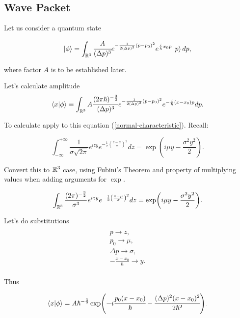 \documentclass[main.tex]{subfiles}
\begin{document}
\subsection{Wave Packet}

Let us consider a quantum state

\begin{equation}
\ket{\phi} = \int_{\mathbb{R}^3} \cfrac{A}{(\Delta p)^3} e^{-\frac{1}{2(\Delta p)^2}(p - p_0)^2} e^{\frac{i}{\hbar}x_0 p}\ket{p} dp,
\end{equation}

where factor $A$ is to be established later. 

Let's calculate amplitude 
\begin{equation}
\bra{x}\ket{\phi} = \int_{\mathbb{R}^3} A \cfrac{ (2\pi\hbar)^{-\frac{3}{2}}}{(\Delta p)^3} e^{-\frac{1}{2(\Delta p)^2}(p - p_0)^2} e^{-\frac{i}{\hbar}(x - x_0) p} dp.
\end{equation}


To calculate apply to this equation (\ref{normal-characteristic}). Recall:

\begin{equation}
\int^{+\infty}_{-\infty} \frac{1}{\sigma \sqrt{2\pi} } e^{izy} e^{-\frac{1}{2}\left(\frac{z-\mu}{\sigma}\right)^2}dz = \exp(i\mu y - \frac{\sigma^2 y^2}{2}).
\end{equation}

Convert this to $\mathbb{R}^3$ case, using Fubini's Theorem and property of multiplying values when adding arguments for $\exp$.

\begin{equation}
\int_{\mathbb{R}^3} \frac{(2\pi)^{-\frac{3}{2}}}{\sigma^3} e^{izy} e^{-\frac{1}{2}\left(\frac{z-\mu}{\sigma}\right)^2}dz = \exp(i\mu y - \frac{\sigma^2 y^2}{2}).
\end{equation}

Let's do substitutions
\begin{multline*}\\
p \to z,\\
p_0 \to \mu, \\
\Delta p \to \sigma, \\
-\frac{x - x_0}{\hbar} \to y.
\\
\end{multline*}

Thus

\begin{equation}
\bra{x}\ket{\phi} = A \hbar^{-\frac{3}{2}}
\exp(-i\cfrac{p_0(x - x_0)}{\hbar} - \cfrac{(\Delta p)^2(x - x_0)^2}{2\hbar^2}).
\end{equation}
\end{document}
